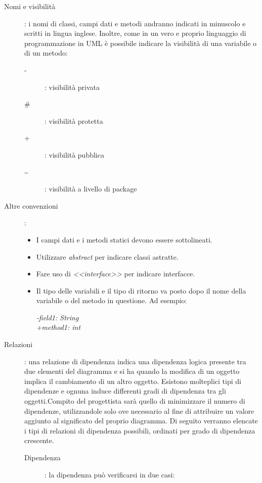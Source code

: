 \documentclass[../../norme-di-progetto.tex]{subfiles}
\begin{document}
\begin{description}
  \item [Nomi e visibilità]: i nomi di classi, campi dati e metodi andranno indicati in minuscolo e scritti in lingua inglese. Inoltre, come in un vero e proprio linguaggio di programmazione in UML è possibile indicare la visibilità di una variabile o di un metodo:
        \begin{description}
          \item [-]: visibilità privata
          \item [\#]: visibilità protetta
          \item [+]: visibilità pubblica
          \item [\textasciitilde]: visibilità a livello di package
        \end{description}
  \item[Altre convenzioni]:
  \begin{itemize}
    \item I campi dati e i metodi statici devono essere sottolineati.
    \item Utilizzare \textit{{abstract}} per indicare classi astratte.
    \item Fare uso di \textit{<<interface>>} per indicare interfacce.
    \item Il tipo delle variabili e il tipo di ritorno va posto dopo il nome della variabile o del metodo in questione. Ad esempio:
    \begin{center}
        \textit{-field1: String} \\\textit{+method1: int}
    \end{center}
  \end{itemize}
  \item [Relazioni]: una relazione di dipendenza indica una dipendenza logica presente tra due elementi del diagramma e si ha quando la modifica di un oggetto implica il cambiamento di un altro oggetto. Esistono molteplici tipi di dipendenze e ognuna induce differenti gradi di dipendenza tra gli oggetti.Compito del progettista sarà quello di minimizzare il numero di dipendenze, utilizzandole solo ove necessario al fine di attribuire un valore aggiunto al significato del proprio diagramma. Di seguito verranno elencate i tipi di relazioni di dipendenza possibili, ordinati per grado di dipendenza crescente.
  \begin{description}
    \item [Dipendenza]: la dipendenza può verificarsi in due casi:
      \begin{itemize}

\end{itemize}
\end{description}
\end{description}
\end{document}
